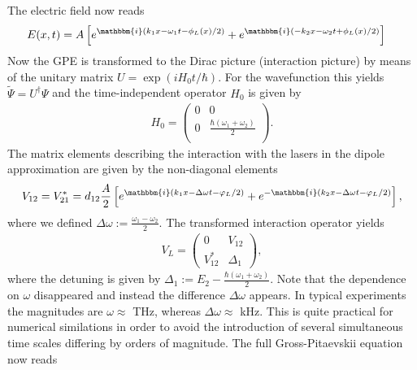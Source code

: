 \documentclass[12pt]{article}
\newcommand{\ic}{\mathbbm{i}}
\begin{document}
The electric field now reads
\begin{align}
  E(x,t) &= A\left[e^{\ic (k_1x-\omega_1 t-\phi_L(x)/2)}+e^{\ic(-k_2x-\omega_2 t+
    \phi_L(x)/2)} \right] 
\end{align}
Now the GPE is transformed to the Dirac picture (interaction picture) by means of the unitary matrix $U=\exp{(i H_0 t/\hbar)}$. For the wavefunction this yields $\tilde{\Psi} = U^\dagger \Psi$ and the time-independent operator $H_0$ is given by
\begin{align}
  H_0 = \begin{pmatrix}
    0 & 0 \\
    0 & \frac{\hbar(\omega_1+\omega_2)}{2} \\
  \end{pmatrix}.
\end{align}
The matrix elements describing the interaction with the lasers in the dipole approximation are given by the non-diagonal elements
\begin{align}
   V_{12}=V_{21}^*= d_{12}\frac{A}{2}\left[e^{\ic\left(k_1x-\Delta \omega t - 
  \varphi_L/2 \right)}+ e^{-\ic\left(k_2x-\Delta\omega t - \varphi_L/2 
  \right)}\right]\label{eq:vlicht},
\end{align}
where we defined $\Delta\omega := \frac{\omega_1-\omega_2}{2}$. The transformed interaction operator yields 
\begin{align}
  V_L = \begin{pmatrix}
    0 & V_{12}\\
    V_{12}^* & \Delta_1 
  \end{pmatrix},
\end{align}
where the detuning is given by 
$\Delta_1 := E_2-\frac{\hbar(\omega_1+\omega_2)}{2} $.
Note that the dependence on $\omega$ disappeared and instead the difference $\Delta \omega$ appears. In typical experiments the magnitudes are  $\omega \approx$ THz, whereas $\Delta \omega \approx$ kHz. This is quite practical for numerical similations in order to avoid  the introduction of several simultaneous time scales differing by orders of magnitude. 
The full Gross-Pitaevskii equation now reads
\end{document}
